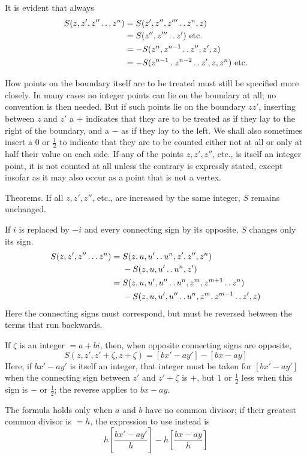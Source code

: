 It is evident that always
\[
\begin{aligned}
S(z,z',z''\ldots z^n)&=S(z',z'',z'''\mathinner{.\,.} z^n,z)\\
&=S(z'',z'''\mathinner{.\,.} z')\text{ etc.}\\
&=-S(z^n,z^{n-1}\mathinner{.\,.} z'',z',z)\\
&=-S(z^{n-1}\mathbin{.} z^{n-2}\mathinner{.\,.} z',z,z^n)\text{ etc.}
\end{aligned}
\]

How points on the boundary itself are to be treated must still be specified more closely. In many cases no integer points can lie on the boundary at all; no convention is then needed. But if such points lie on the boundary $zz'$, inserting between $z$ and $z'$ a $+$ indicates that they are to be treated as if they lay to the right of the boundary, and a $-$ as if they lay to the left. We shall also sometimes insert a $0$ or $\frac12$ to indicate that they are to be counted either not at all or only at half their value on
each side. If any of the points $z,z',z''$, etc., is itself an integer point, it is not counted at all unless the contrary is expressly stated, except insofar as it may also occur as a point that is not a vertex.

Theorems. If all $z,z',z''$, etc., are increased by the same integer, $S$ remains unchanged.

If $i$ is replaced by $-i$ and every connecting sign by its opposite, $S$ changes only its sign.
\[
\begin{aligned}
S(z,z',z''\ldots z^n)={}&S(z,u,u'\mathinner{.\,.} u^n,z',z'',z^n)\\
&-S(z,u,u'\mathinner{.\,.} u^n,z')\\
={}&S(z,u,u',u''\mathinner{.\,.} u^n,z^m,z^{m+1}\mathinner{.\,.} z^n)\\
&-S(z,u,u',u''\mathinner{.\,.} u^n,z^m,z^{m-1}\mathinner{.\,.} z',z)
\end{aligned}
\]
Here the connecting signs must correspond, but must be reversed between the terms that run backwards.

If $\zeta$ is an integer $=a+bi$, then, when opposite connecting signs are opposite,
\[
S(z,z',z'+\zeta,z+\zeta)=[bx'-ay']-[bx-ay]
\]
Here, if $bx'-ay'$ is itself an integer, that integer must be taken for $[bx'-ay']$ when the connecting sign between $z'$ and $z'+\zeta$ is $+$, but $1$ or $\frac12$ less when this sign is $-$ or $\frac12$; the reverse applies to $bx-ay$.

The formula holds only when $a$ and $b$ have no common divisor; if their greatest common divisor is $=h$, the expression to use instead is
\[
h\left[\frac{bx'-ay'}h\right]-h\left[\frac{bx-ay}h\right]
\]
